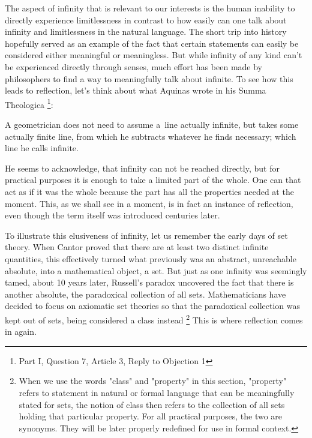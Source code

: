 \documentclass[12pt,a4paper]{article}
\begin{document}
The aspect of infinity that is relevant to our interests is the human inability to directly experience limitlessness in contrast to how easily can one talk about infinity and limitlessness in the natural language. The short trip into history hopefully served as an example of the fact that certain statements can easily be considered either meaningful or meaningless. 
But while infinity of any kind can't be experienced directly through senses, much effort has been made by philosophers to find a way to meaningfully talk about infinite. 
To see how this leads to reflection, let's think about what Aquinas wrote in his Summa Theologica \footnote{Part I, Question 7, Article 3, Reply to Objection 1}:
\begin{displayquote}
A geometrician does not need to assume a~line actually infinite, but takes some actually finite line, from which he subtracts whatever he finds necessary; which line he calls infinite.
\end{displayquote}
He seems to acknowledge, that infinity can not be reached directly, but for practical purposes it is enough to take a limited part of the whole. One can that act as if it was the whole because the part has all the properties needed at the moment. This, as we shall see in a moment, is in fact an instance of reflection, even though the term itself was introduced centuries later.

To illustrate this elusiveness of infinity, let us remember the early days of set theory. When Cantor proved that there are at least two distinct infinite quantities, this effectively turned what previously was an abstract, unreachable absolute, into a mathematical object, a set. But just as one infinity was seemingly tamed, about 10 years later, Russell's paradox uncovered the fact that there is another absolute, the paradoxical collection of all sets. Mathematicians have decided to focus on axiomatic set theories so that the paradoxical collection was kept out of sets, being considered a class instead \footnote{When we use the words "class" and "property" in this section, "property" refers to statement in natural or formal language that can be meaningfully stated for sets, the notion of class then refers to the collection of all sets holding that particular property. For all practical purposes, the two are synonyms. They will be later properly redefined for use in formal context.}
This is where reflection comes in again. 
\end{document}
